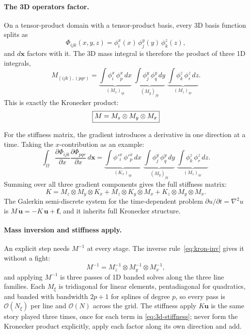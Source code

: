 \documentclass[11pt]{article}
\newcommand{\kron}{\otimes}
\newcommand{\bigO}{\mathcal{O}}
\newcommand{\Nall}{N}
\begin{document}
\paragraph{The 3D operators factor.}
On a tensor-product domain with a tensor-product basis, every 3D
basis function splits as
\begin{equation}
\label{eq:galerkin-basis}
  \Phi_{ijk}(x,y,z) = \phi^x_i(x)\,\phi^y_j(y)\,\phi^z_k(z),
\end{equation}
and $d\bm{x}$ factors with it.  The 3D mass integral is therefore
the product of three 1D integrals,
\begin{equation}
\label{eq:mass-factor}
  M_{(ijk),(pqr)}
  = \underbrace{\int \phi^x_i\,\phi^x_p\,dx}_{(M_x)_{ip}}
  \;\underbrace{\int \phi^y_j\,\phi^y_q\,dy}_{(M_y)_{jq}}
  \;\underbrace{\int \phi^z_k\,\phi^z_r\,dz}_{(M_z)_{kr}}.
\end{equation}
This is exactly the Kronecker product:
\begin{equation}
\label{eq:3d-mass}
  \boxed{%
    M = M_z \kron M_y \kron M_x
  }
\end{equation}

For the stiffness matrix, the gradient introduces a derivative in one
direction at a time.  Taking the $x$-contribution as an example:
\begin{equation}
  \int_\Omega \frac{\partial\Phi_{ijk}}{\partial x}
  \frac{\partial\Phi_{pqr}}{\partial x}\,d\bm{x}
  = \underbrace{\int \phi'^x_i\,\phi'^x_p\,dx}_{(K_x)_{ip}}
  \;\underbrace{\int \phi^y_j\,\phi^y_q\,dy}_{(M_y)_{jq}}
  \;\underbrace{\int \phi^z_k\,\phi^z_r\,dz}_{(M_z)_{kr}}.
\end{equation}
Summing over all three gradient components gives the full stiffness
matrix:
\begin{equation}
\label{eq:3d-stiffness}
  K = M_z \kron M_y \kron K_x
    + M_z \kron K_y \kron M_x
    + K_z \kron M_y \kron M_x.
\end{equation}
The Galerkin semi-discrete system for the time-dependent problem
$\partial u/\partial t = \nabla^2 u$ is
$M\,\dot{\bm{u}} = -K\,\bm{u} + \bm{f}$, and it inherits full
Kronecker structure.

\paragraph{Mass inversion and stiffness apply.}
An explicit step needs $M^{-1}$ at every stage.  The inverse
rule~\eqref{eq:kron-inv} gives it without a fight:
\begin{equation}
  M^{-1} = M_z^{-1} \kron M_y^{-1} \kron M_x^{-1},
\end{equation}
and applying $M^{-1}$ is three passes of 1D banded solves along the
three line families.  Each $M_\xi$ is tridiagonal for linear
elements, pentadiagonal for quadratics, and banded with bandwidth
$2p+1$ for splines of degree $p$, so every pass is $\bigO(N_\xi)$
per line and $\bigO(\Nall)$ across the grid.  The stiffness apply
$K\bm{u}$ is the same story played three times, once for each term
in \cref{eq:3d-stiffness}; never form the Kronecker product
explicitly, apply each factor along its own direction and add.
\end{document}
